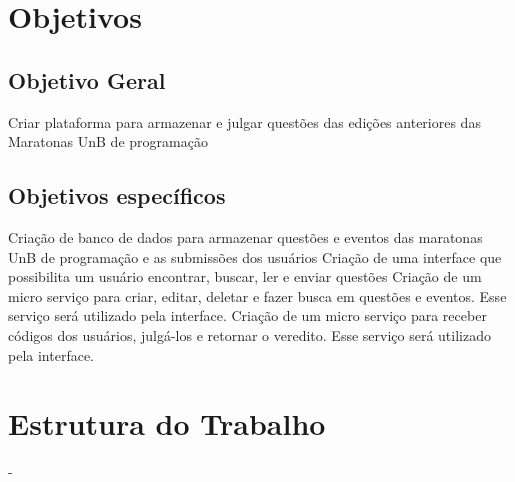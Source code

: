 \section{Objetivos}

\subsection{Objetivo Geral} 

Criar plataforma para armazenar e julgar questões das edições anteriores das Maratonas UnB de programação

\subsection{Objetivos específicos}

Criação de banco de dados para armazenar questões e eventos das maratonas UnB de programação e as submissões dos usuários 
Criação de uma interface que possibilita um usuário encontrar, buscar, ler e enviar questões
Criação de um micro serviço para criar, editar, deletar e fazer busca em questões e eventos. Esse serviço será utilizado pela interface.
Criação  de um micro serviço para receber códigos dos usuários, julgá-los e retornar o veredito. Esse serviço será utilizado pela interface.

\section{Estrutura do Trabalho}

-

